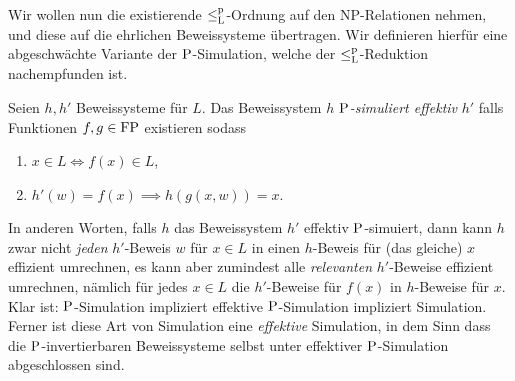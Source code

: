Wir wollen nun die existierende $\leqlp$-Ordnung auf den NP-Relationen nehmen, und diese auf die ehrlichen Beweissysteme übertragen. Wir definieren hierfür eine abgeschwächte Variante der $\P$-Simulation, welche der $\leqlp$-Reduktion nachempfunden ist.
\begin{definition}
    Seien $h,h'$ Beweissysteme für $L$. Das Beweissystem $h$ \emph{$\P$-simuliert effektiv} $h'$ falls Funktionen $f,g\in\FP$ existieren sodass
    \begin{enumerate}
        \item $x\in L \iff f(x)\in L$,
        \item $ h'(w)=f(x) \implies h(g(x, w)) = x. $
    \end{enumerate}
\end{definition}
In anderen Worten, falls $h$ das Beweissystem $h'$ effektiv $\P$-simuiert, dann kann $h$ zwar nicht \emph{jeden} $h'$-Beweis $w$ für $x\in L$ in einen $h$-Beweis für (das gleiche) $x$ effizient umrechnen, es kann aber zumindest alle \emph{relevanten} $h'$-Beweise effizient umrechnen, nämlich für jedes $x\in L$ die $h'$-Beweise für $f(x)$ in $h$-Beweise für $x$.
Klar ist: $\P$-Simulation impliziert effektive $\P$-Simulation impliziert Simulation.
Ferner ist diese Art von Simulation eine \emph{effektive} Simulation, in dem Sinn dass die $\P$-invertierbaren Beweissysteme selbst unter effektiver $\P$-Simulation abgeschlossen sind.


